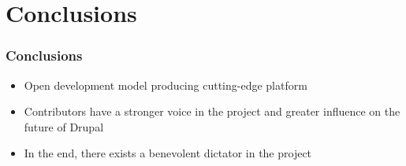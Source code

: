 \section{Conclusions}
\begin{frame}[allowframebreaks]
\frametitle{Conclusions}

\begin{itemize}
	\item Open development model producing cutting-edge platform
	\item Contributors have a stronger voice in the project and greater influence on the future of Drupal
	\item In the end, there exists a benevolent dictator in the project
\end{itemize}

\end{frame}
